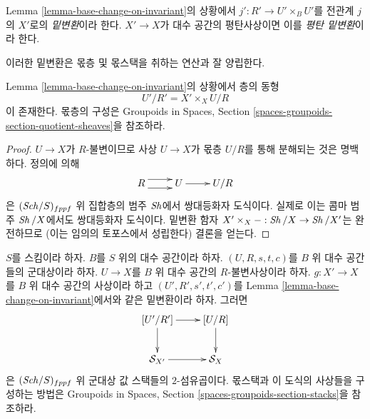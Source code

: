 \begin{definition}
\label{definition-base-change}
Lemma \ref{lemma-base-change-on-invariant}의 상황에서
$j' : R' \to U' \times_B U'$를 전관계 $j$의 $X'$로의
{\it 밑변환}이라 한다. $X' \to X$가 대수 공간의 평탄사상이면 이를
{\it 평탄 밑변환}이라 한다.
\end{definition}

\noindent
이러한 밑변환은 몫층 및 몫스택을 취하는 연산과 잘 양립한다.

\begin{lemma}
\label{lemma-base-change-quotient-sheaf}
Lemma \ref{lemma-base-change-on-invariant}의 상황에서 층의 동형
$$
U'/R' = X' \times_X U/R
$$
이 존재한다. 몫층의 구성은 Groupoids in Spaces, Section
\ref{spaces-groupoids-section-quotient-sheaves}을 참조하라.
\end{lemma}

\begin{proof}
$U \to X$가 $R$-불변이므로 사상 $U \to X$가 몫층 $U/R$를 통해
분해되는 것은 명백하다. 정의에 의해
$$
\xymatrix{
R \ar@<1ex>[r] \ar@<-1ex>[r] &
U \ar[r] &
U/R
}
$$
은 $(\mathit{Sch}/S)_{fppf}$ 위 집합층의 범주 $\mathop{\mathit{Sh}}\nolimits$에서 쌍대등화자 도식이다.
실제로 이는 콤마 범주 $\mathop{\mathit{Sh}}\nolimits/X$에서도 쌍대등화자 도식이다. 밑변환 함자
$X' \times_X - : \mathop{\mathit{Sh}}\nolimits/X \to \mathop{\mathit{Sh}}\nolimits/X'$는 완전하므로
(이는 임의의 토포스에서 성립한다) 결론을 얻는다.
\end{proof}

\begin{lemma}
\label{lemma-base-change-quotient-stack}
$S$를 스킴이라 하자. $B$를 $S$ 위의 대수 공간이라 하자.
$(U, R, s, t, c)$를 $B$ 위 대수 공간들의 군대상이라 하자.
$U \to X$를 $B$ 위 대수 공간의 $R$-불변사상이라 하자.
$g : X' \to X$를 $B$ 위 대수 공간의 사상이라 하고
$(U', R', s', t', c')$를 Lemma
\ref{lemma-base-change-on-invariant}에서와 같은 밑변환이라 하자. 그러면
$$
\xymatrix{
[U'/R'] \ar[r] \ar[d] & [U/R] \ar[d] \\
\mathcal{S}_{X'} \ar[r] & \mathcal{S}_X
}
$$
은 $(\mathit{Sch}/S)_{fppf}$ 위 군대상 값 스택들의 $2$-섬유곱이다.
몫스택과 이 도식의 사상들을 구성하는 방법은
Groupoids in Spaces, Section \ref{spaces-groupoids-section-stacks}을
참조하라.
\end{lemma}

